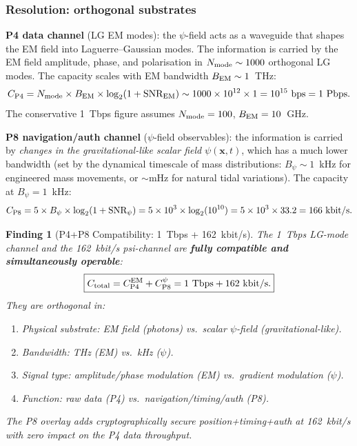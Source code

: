 \documentclass[aps,prd,twocolumn,superscriptaddress,nofootinbib,longbibliography]{revtex4-2}
\newtheorem{finding}{Finding}
\begin{document}
\subsubsection{Resolution: orthogonal substrates}

\textbf{P4 data channel} (LG EM modes): the $\psi$-field acts as a
waveguide that shapes the EM field into Laguerre--Gaussian modes.
The information is carried by the EM field amplitude, phase, and
polarisation in $N_{\rm mode}\sim1000$ orthogonal LG modes.
The capacity scales with EM bandwidth $B_{\rm EM}\sim1$~THz:
\begin{equation}
C_{\rm P4} = N_{\rm mode}\times B_{\rm EM}\times\log_2(1+\text{SNR}_{\rm EM})
\sim 1000\times10^{12}\times1 = 10^{15}\ \si{bps} = 1\ \si{Pbps}.
\end{equation}
The conservative 1~Tbps figure assumes $N_{\rm mode} = 100$,
$B_{\rm EM} = 10$~GHz.

\textbf{P8 navigation/auth channel} ($\psi$-field observables): the
information is carried by \emph{changes in the gravitational-like
scalar field} $\psi(\mathbf{x},t)$, which has a much lower bandwidth
(set by the dynamical timescale of mass distributions:
$B_\psi\sim 1$~kHz for engineered mass movements, or $\sim$mHz
for natural tidal variations).  The capacity at $B_\psi = 1$~kHz:
\begin{equation}
C_{\rm P8} = 5\times B_\psi\times\log_2(1+\text{SNR}_\psi)
= 5\times10^3\times\log_2(10^{10}) = 5\times10^3\times33.2 = 166\ \si{kbit/s}.
\end{equation}

\begin{finding}[P4+P8 Compatibility: 1~Tbps + 162~kbit/s]
The 1~Tbps LG-mode channel and the 162~kbit/s psi-channel are
\textbf{fully compatible and simultaneously operable}:
\begin{equation}
\boxed{C_{\rm total} = C_{\rm P4}^{\rm EM} + C_{\rm P8}^{\psi}
= 1\ \si{Tbps} + 162\ \si{kbit/s}.}
\end{equation}
They are orthogonal in:
\begin{enumerate}
\item \textit{Physical substrate}: EM field (photons) vs.\ scalar
$\psi$-field (gravitational-like).
\item \textit{Bandwidth}: THz (EM) vs.\ kHz ($\psi$).
\item \textit{Signal type}: amplitude/phase modulation (EM) vs.\
gradient modulation ($\psi$).
\item \textit{Function}: raw data (P4) vs.\ navigation/timing/auth (P8).
\end{enumerate}
The P8 overlay adds cryptographically secure position+timing+auth at
162~kbit/s with zero impact on the P4 data throughput.
\end{finding}
\end{document}
